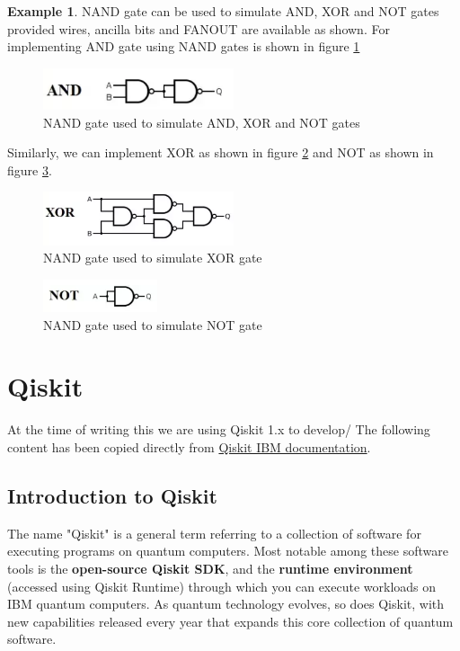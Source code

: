 \documentclass[12pt, oneside]{book}
\theoremstyle{definition}
\theoremstyle{definition}
\newtheorem{example}{Example}[section]
\theoremstyle{remark}
\begin{document}
\begin{example}
    NAND gate can be used to simulate AND, XOR and NOT gates provided wires, ancilla bits and FANOUT are available as shown.
    For implementing AND gate using NAND gates is shown in figure \ref{fig:and_imp}
    \begin{figure}[H]
        \centering
        \includegraphics[width=0.5\textwidth]{../images/and_imp.png}
        \caption{NAND gate used to simulate AND, XOR and NOT gates}
        \label{fig:and_imp}
    \end{figure}
    Similarly, we can implement XOR as shown in figure \ref{fig:xor_imp} and NOT as shown in figure \ref{fig:not_imp}.
    \begin{figure}[H]
        \centering
        \includegraphics[width=0.5\textwidth]{../images/xor_imp.png}
        \caption{NAND gate used to simulate XOR gate}
        \label{fig:xor_imp}
    \end{figure}
    \begin{figure}[H]
        \centering
        \includegraphics[width=0.3\textwidth]{../images/not_imp.png}
        \caption{NAND gate used to simulate NOT gate}
        \label{fig:not_imp}
    \end{figure}

\end{example}




\chapter{Qiskit}
At the time of writing this we are using Qiskit 1.x to develop/ The following content has been copied directly from \href{https://docs.quantum.ibm.com/guides}{Qiskit IBM documentation}.
\section{Introduction to Qiskit}
The name "Qiskit" is a general term referring to a collection of software for executing programs on quantum computers. Most notable among these software tools is the \textbf{open-source Qiskit SDK}, and the \textbf{runtime environment} (accessed using Qiskit Runtime) through which you can execute workloads on IBM quantum computers. As quantum technology evolves, so does Qiskit, with new capabilities released every year that expands this core collection of quantum software.
\end{document}
